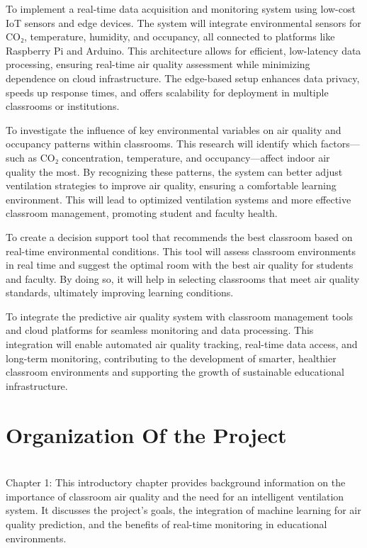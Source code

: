 To implement a real-time data acquisition and monitoring system using low-cost IoT sensors and edge devices. The system will integrate environmental sensors for CO₂, temperature, humidity, and occupancy, all connected to platforms like Raspberry Pi and Arduino. This architecture allows for efficient, low-latency data processing, ensuring real-time air quality assessment while minimizing dependence on cloud infrastructure. The edge-based setup enhances data privacy, speeds up response times, and offers scalability for deployment in multiple classrooms or institutions.

To investigate the influence of key environmental variables on air quality and occupancy patterns within classrooms. This research will identify which factors—such as CO₂ concentration, temperature, and occupancy—affect indoor air quality the most. By recognizing these patterns, the system can better adjust ventilation strategies to improve air quality, ensuring a comfortable learning environment. This will lead to optimized ventilation systems and more effective classroom management, promoting student and faculty health.

To create a decision support tool that recommends the best classroom based on real-time environmental conditions. This tool will assess classroom environments in real time and suggest the optimal room with the best air quality for students and faculty. By doing so, it will help in selecting classrooms that meet air quality standards, ultimately improving learning conditions.

To integrate the predictive air quality system with classroom management tools and cloud platforms for seamless monitoring and data processing. This integration will enable automated air quality tracking, real-time data access, and long-term monitoring, contributing to the development of smarter, healthier classroom environments and supporting the growth of sustainable educational infrastructure.
\newpage
\section{Organization Of the Project}\\
Chapter 1: This introductory chapter provides background information on the importance of classroom air quality and the need for an intelligent ventilation system. It discusses the project's goals, the integration of machine learning for air quality prediction, and the benefits of real-time monitoring in educational environments.

